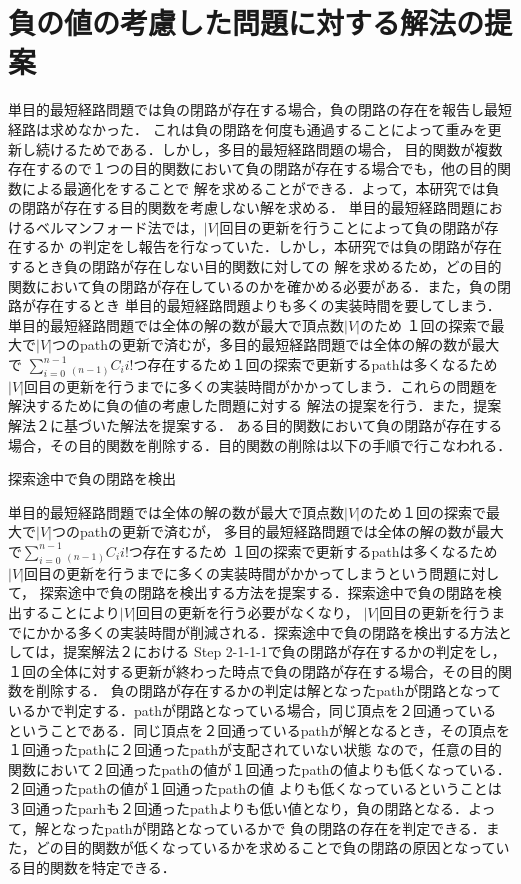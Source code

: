 \documentclass[12pt]{optlab-bachelor}
\begin{document}
\section{負の値の考慮した問題に対する解法の提案}

単目的最短経路問題では負の閉路が存在する場合，負の閉路の存在を報告し最短経路は求めなかった．
これは負の閉路を何度も通過することによって重みを更新し続けるためである．しかし，多目的最短経路問題の場合，
目的関数が複数存在するので１つの目的関数において負の閉路が存在する場合でも，他の目的関数による最適化をすることで
解を求めることができる．よって，本研究では負の閉路が存在する目的関数を考慮しない解を求める．
単目的最短経路問題におけるベルマンフォード法では，$|V|$回目の更新を行うことによって負の閉路が存在するか
の判定をし報告を行なっていた．しかし，本研究では負の閉路が存在するとき負の閉路が存在しない目的関数に対しての
解を求めるため，どの目的関数において負の閉路が存在しているのかを確かめる必要がある．また，負の閉路が存在するとき
単目的最短経路問題よりも多くの実装時間を要してしまう．単目的最短経路問題では全体の解の数が最大で頂点数$|V|$のため
１回の探索で最大で$|V|$つのpathの更新で済むが，多目的最短経路問題では全体の解の数が最大で
$\displaystyle \sum_{i=0}^{n-1} {}_{(n-1)}C_i i!$つ存在するため１回の探索で更新するpathは多くなるため
$|V|$回目の更新を行うまでに多くの実装時間がかかってしまう．これらの問題を解決するために負の値の考慮した問題に対する
解法の提案を行う．また，提案解法２に基づいた解法を提案する．
ある目的関数において負の閉路が存在する場合，その目的関数を削除する．目的関数の削除は以下の手順で行こなわれる．

\begin{description}
  \item[探索途中で負の閉路を検出]
\end{description}

単目的最短経路問題では全体の解の数が最大で頂点数$|V|$のため１回の探索で最大で$|V|$つのpathの更新で済むが，
多目的最短経路問題では全体の解の数が最大で$\displaystyle \sum_{i=0}^{n-1} {}_{(n-1)}C_i i!$つ存在するため
１回の探索で更新するpathは多くなるため$|V|$回目の更新を行うまでに多くの実装時間がかかってしまうという問題に対して，
探索途中で負の閉路を検出する方法を提案する．探索途中で負の閉路を検出することにより$|V|$回目の更新を行う必要がなくなり，
$|V|$回目の更新を行うまでにかかる多くの実装時間が削減される．探索途中で負の閉路を検出する方法としては，提案解法２における
Step 2-1-1-1で負の閉路が存在するかの判定をし，１回の全体に対する更新が終わった時点で負の閉路が存在する場合，その目的関数を削除する．
負の閉路が存在するかの判定は解となったpathが閉路となっているかで判定する．pathが閉路となっている場合，同じ頂点を２回通っている
ということである．同じ頂点を２回通っているpathが解となるとき，その頂点を１回通ったpathに２回通ったpathが支配されていない状態
なので，任意の目的関数において２回通ったpathの値が１回通ったpathの値よりも低くなっている．２回通ったpathの値が１回通ったpathの値
よりも低くなっているということは３回通ったparhも２回通ったpathよりも低い値となり，負の閉路となる．よって，解となったpathが閉路となっているかで
負の閉路の存在を判定できる．また，どの目的関数が低くなっているかを求めることで負の閉路の原因となっている目的関数を特定できる．
\end{document}
